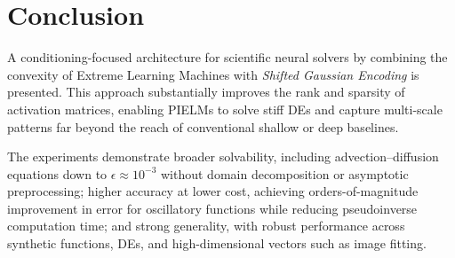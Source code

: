 \documentclass{article}
\begin{document}
\section{Conclusion}
A conditioning-focused architecture for scientific neural solvers by combining the convexity of Extreme Learning Machines with \textit{Shifted Gaussian Encoding} is presented. This approach substantially improves the rank and sparsity of activation matrices, enabling PIELMs to solve stiff DEs and capture multi-scale patterns far beyond the reach of conventional shallow or deep baselines.

The experiments demonstrate broader solvability, including advection--diffusion equations down to $\epsilon \approx 10^{-3}$ without domain decomposition or asymptotic preprocessing; higher accuracy at lower cost, achieving orders-of-magnitude improvement in error for oscillatory functions while reducing pseudoinverse computation time; and strong generality, with robust performance across synthetic functions, DEs, and high-dimensional vectors such as image fitting.
\end{document}
